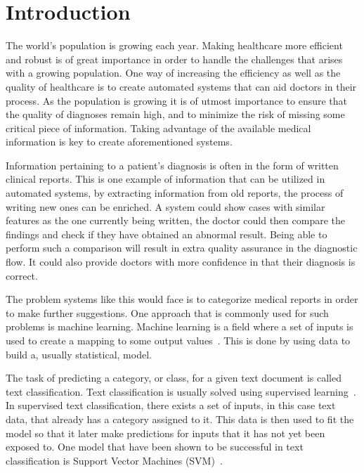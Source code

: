 \chapter{Introduction}
\label{cha:introduction}

The world's population is growing each year. 
Making healthcare more efficient and robust is of great importance in order to handle the challenges that arises with a growing population.
One way of increasing the efficiency as well as the quality of healthcare is to create automated systems that can aid doctors in their process.
As the population is growing it is of utmost importance to ensure that the quality of diagnoses remain high, and to minimize the risk of missing some critical piece of information.
Taking advantage of the available medical information is key to create aforementioned systems.

Information pertaining to a patient's diagnosis is often in the form of written clinical reports.
This is one example of information that can be utilized in automated systems, by extracting information from old reports, the process of writing new ones can be enriched.
A system could show cases with similar features as the one currently being written, the doctor could then compare the findings and check if they have obtained an abnormal result.
Being able to perform such a comparison will result in extra quality assurance in the diagnostic flow.
It could also provide doctors with more confidence in that their diagnosis is correct.

The problem systems like this would face is to categorize medical reports in order to make further suggestions.
One approach that is commonly used for such problems is machine learning.
Machine learning is a field where a set of inputs is used to create a mapping to some output values~\cite{bishop2006pattern}.
This is done by using data to build a, usually statistical, model.

The task of predicting a category, or class, for a given text document is called text classification.
Text classification is usually solved using supervised learning~\cite{aggarwal2012surveyclass}. 
In supervised text classification, there exists a set of inputs, in this case text data, that already has a category assigned to it.
This data is then used to fit the model so that it later make predictions for inputs that it has not yet been exposed to.
One model that have been shown to be successful in text classification is Support Vector Machines (SVM)~\cite{joachims1998text, aggarwal2012surveyclass, tong2001support}.

